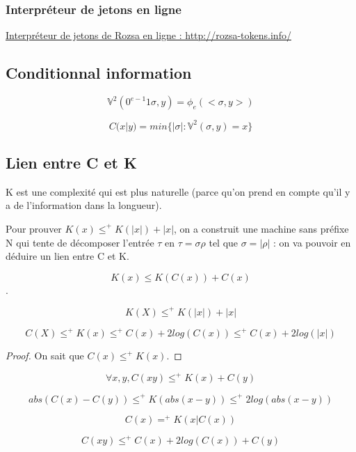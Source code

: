 	\subsubsection{Interpréteur de jetons en ligne}

\href{http://rozsa-tokens.info/}{Interpréteur de jetons de Rozsa en ligne : http://rozsa-tokens.info/}

\subsection{Conditionnal information}

\begin{definition}
$$\mathbb{V}^2(0^{e-1}1\sigma,y)=\phi_e(<\sigma,y>)$$
\end{definition}

\begin{definition}
$$C(x|y) = min\{|\sigma|:\mathbb{V}^2(\sigma,y)=x\}$$
\end{definition}

\subsection{Lien entre C et K}

\par K est une complexité qui est plus naturelle (parce qu'on prend en compte qu'il y a de l'information dans la longueur).
\par Pour prouver $K(x) \leqslant^+ K(|x|)+|x|$, on a construit une machine sans préfixe N qui tente de décomposer l'entrée $\tau$ en $\tau=\sigma\rho$ tel que $\sigma = |\rho|$ : on va pouvoir en déduire un lien entre C et K.

\begin{theorem}
$$K(x)\leqslant K(C(x))+C(x)$$.
\end{theorem}

\begin{theorem}
$$K(X) \leqslant^+ K(|x|)+|x|$$
\end{theorem}

\begin{theorem}
$$C(X) \leqslant^+ K(x) \leqslant^+ C(x) + 2 log(C(x)) \leqslant^+ C(x)+2log(|x|)$$
\end{theorem}

\begin{proof}
On sait que $C(x) \leqslant^+ K(x).$
\end{proof}

\begin{theorem}
$$\forall x,y, C(xy) \leqslant^+ K(x) + C(y)$$
\end{theorem}

\begin{theorem}
$$abs(C(x)-C(y)) \leqslant^+ K(abs(x-y)) \leqslant^+ 2log(abs(x-y))$$
\end{theorem}

\begin{theorem}
$$C(x) =^+ K(x|C(x))$$
\end{theorem}

\begin{corollary}
$$C(xy) \leqslant^+ C(x) + 2 log(C(x))+C(y)$$
\end{corollary}